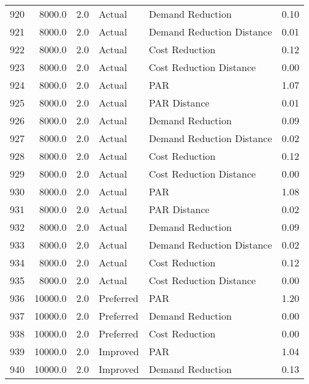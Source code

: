 \begin{longtable}{lrrllr}
920  &       8000.0 &     2.0 &         Actual &           Demand Reduction &   0.10 \\
921  &       8000.0 &     2.0 &         Actual &  Demand Reduction Distance &   0.01 \\
922  &       8000.0 &     2.0 &         Actual &             Cost Reduction &   0.12 \\
923  &       8000.0 &     2.0 &         Actual &    Cost Reduction Distance &   0.00 \\
924  &       8000.0 &     2.0 &         Actual &                        PAR &   1.07 \\
925  &       8000.0 &     2.0 &         Actual &               PAR Distance &   0.01 \\
926  &       8000.0 &     2.0 &         Actual &           Demand Reduction &   0.09 \\
927  &       8000.0 &     2.0 &         Actual &  Demand Reduction Distance &   0.02 \\
928  &       8000.0 &     2.0 &         Actual &             Cost Reduction &   0.12 \\
929  &       8000.0 &     2.0 &         Actual &    Cost Reduction Distance &   0.00 \\
930  &       8000.0 &     2.0 &         Actual &                        PAR &   1.08 \\
931  &       8000.0 &     2.0 &         Actual &               PAR Distance &   0.02 \\
932  &       8000.0 &     2.0 &         Actual &           Demand Reduction &   0.09 \\
933  &       8000.0 &     2.0 &         Actual &  Demand Reduction Distance &   0.02 \\
934  &       8000.0 &     2.0 &         Actual &             Cost Reduction &   0.12 \\
935  &       8000.0 &     2.0 &         Actual &    Cost Reduction Distance &   0.00 \\
936  &      10000.0 &     2.0 &      Preferred &                        PAR &   1.20 \\
937  &      10000.0 &     2.0 &      Preferred &           Demand Reduction &   0.00 \\
938  &      10000.0 &     2.0 &      Preferred &             Cost Reduction &   0.00 \\
939  &      10000.0 &     2.0 &       Improved &                        PAR &   1.04 \\
940  &      10000.0 &     2.0 &       Improved &           Demand Reduction &   0.13 \\

\end{longtable}
